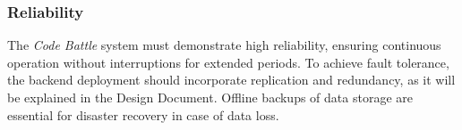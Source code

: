 \subsubsection{Reliability}
The \textit{Code Battle} system must demonstrate high reliability, ensuring continuous operation without interruptions for extended periods. To achieve fault tolerance, the backend deployment should incorporate replication and redundancy, as it will be explained in the Design Document. Offline backups of data storage are essential for disaster recovery in case of data loss.

